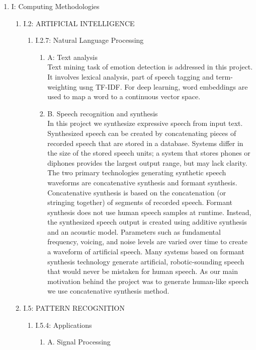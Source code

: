\documentclass[oneside,a4paper,12pt]{book}
\begin{document}
\begin{enumerate}
\begin{enumerate}
	\end{enumerate}	 
	\item[] I: Computing Methodologies
	\begin{enumerate}
		\item[] I.2: ARTIFICIAL INTELLIGENCE
		\begin{enumerate}
			\item[] I.2.7: Natural Language Processing
			\begin{enumerate}
				\item[] A: Text analysis \\
						Text mining task of emotion detection is addressed in this project. It involves lexical analysis, part of speech tagging and term-weighting usng TF-IDF. For deep learning, word embeddings are used to map a word to a continuous vector space.\\
				\item[] B. Speech recognition and synthesis\\
						In this project we synthesize expressive speech from input text. Synthesized speech can be created by concatenating pieces of recorded speech that are stored in a database.
						Systems differ in the size of the stored speech units; a system that stores phones or diphones provides the largest output range, but may lack clarity.
						The two primary technologies generating synthetic speech waveforms are concatenative synthesis and formant synthesis.
						Concatenative synthesis is based on the concatenation (or stringing together) of segments of recorded speech.
						Formant synthesis does not use human speech samples at runtime. Instead, the synthesized speech output is created using additive synthesis and an acoustic model.
						Parameters such as fundamental frequency, voicing, and noise levels are varied over time to create a waveform of artificial speech.
						Many systems based on formant synthesis technology generate artificial, robotic-sounding speech that would never be mistaken for human speech. As our main motivation behind the
						project was to generate human-like speech we use concatenative synthesis method.\\
			\end{enumerate}
		\end{enumerate}
		\item[] I.5: PATTERN RECOGNITION
		\begin{enumerate}
			\item[] I.5.4: Applications
			\begin{enumerate}
				\item[] A. Signal Processing

\end{enumerate}
\end{enumerate}
\end{enumerate}
\end{enumerate}
\end{document}
